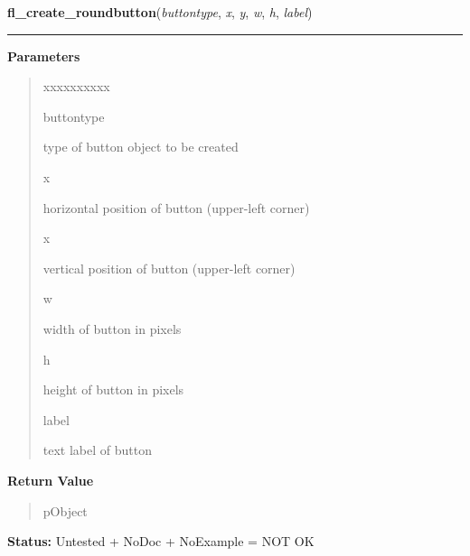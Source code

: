     \label{xformslib:library:fl_create_roundbutton}

    \vspace{0.5ex}

\hspace{.8\funcindent}\begin{boxedminipage}{\funcwidth}

    \raggedright \textbf{fl\_create\_roundbutton}(\textit{buttontype}, \textit{x}, \textit{y}, \textit{w}, \textit{h}, \textit{label})

    \vspace{-1.5ex}

    \rule{\textwidth}{0.5\fboxrule}
\setlength{\parskip}{2ex}
\setlength{\parskip}{1ex}
      \textbf{Parameters}
      \vspace{-1ex}

      \begin{quote}
        \begin{Ventry}{xxxxxxxxxx}

          \item[buttontype]

          type of button object to be created

          \item[x]

          horizontal position of button (upper-left corner)

          \item[x]

          vertical position of button (upper-left corner)

          \item[w]

          width of button in pixels

          \item[h]

          height of button in pixels

          \item[label]

          text label of button

        \end{Ventry}

      \end{quote}

      \textbf{Return Value}
    \vspace{-1ex}

      \begin{quote}
      pObject

      \end{quote}

\textbf{Status:} Untested + NoDoc + NoExample = NOT OK



    \end{boxedminipage}

